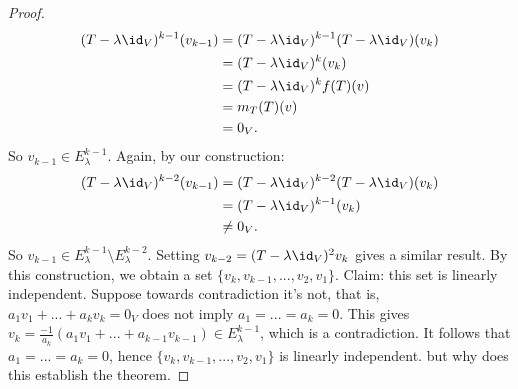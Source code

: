 \begin{proof}
\begin{equation*}
                \begin{split}
                    (T - \lambda \id_V)^{k-1}(v_{k-1}) 
                    & = (T - \lambda \id_V)^{k-1} (T - \lambda \id_V)(v_k) \\
                    & = (T - \lambda \id_V)^k (v_k)\\
                    & = (T - \lambda \id_V)^k f(T)(v) \\
                    & = m_T(T)(v) \\
                    & = 0_V.
                \end{split}
                \end{equation*}
            So $v_{k-1} \in E_\lambda^{k-1}$. Again, by our construction:
                \begin{equation*}
                \begin{split}
                    (T - \lambda \id_V)^{k-2}(v_{k-1})
                    & = (T - \lambda \id_V)^{k-2}(T - \lambda \id_V)(v_k) \\
                    & =(T - \lambda \id_V)^{k-1}(v_k) \\
                    & \neq 0_V.
                \end{split}
                \end{equation*}
            So $v_{k-1} \in E_\lambda^{k-1} \setminus E_\lambda^{k-2}$. Setting $v_{k-2} = (T - \lambda \id_V)^2v_k$ gives a similar result. By this construction, we obtain a set $\{v_k,v_{k-1},...,v_2,v_1\}$. Claim: this set is linearly independent. Suppose towards contradiction it's not, that is, $a_1v_1 + ... + a_k v_k = 0_V$ does not imply $a_1 = ... = a_k = 0$. This gives $v_k = \frac{-1}{a_k}(a_1v_1 + ... + a_{k-1}v_{k-1}) \in E_\lambda^{k-1}$, which is a contradiction. It follows that $a_1 = ... = a_k = 0$, hence $\{v_k,v_{k-1},...,v_2,v_1\}$ is linearly independent. {\color{red} but why does this establish the theorem}.
        \end{proof}

